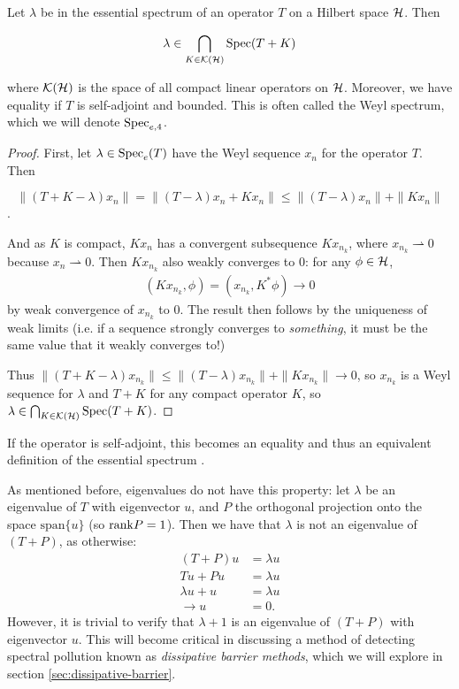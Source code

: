 \documentclass[../main.tex]{subfiles}
\begin{document}
\begin{theorem}
\label{thm:ess-spec-comp-ptb}
  Let $\lambda$ be in the essential spectrum of an operator $T$ on a Hilbert space
  $\mathcal{H}$. Then

  \begin{equation}
  \label{eqn:weyl_spectrum}
    \lambda \in \bigcap_{K \in \mathcal{K}(\mathcal{H})} \mathrm{Spec}(T + K)
  \end{equation}

  where $\mathcal{K}(\mathcal{H})$ is the space of all compact linear operators on $\mathcal{H}$.
  Moreover, we have equality if $T$ is self-adjoint and bounded.
  This is often called the Weyl spectrum, which we will denote $\mathrm{Spec}_{e,4}$.
\end{theorem}
\begin{proof}
First, let $\lambda \in \mathrm{Spec}_e(T)$ have the Weyl sequence $x_n$ for the operator $T$. Then 

$$\|(T+K-\lambda)x_n\| = \|(T - \lambda)x_n+Kx_n\| \leq \|(T - \lambda)x_n\| + \|Kx_n\|$$. 

And as $K$ is compact, $Kx_n$ has a convergent subsequence $Kx_{n_k}$, where
$x_{n_k} \rightharpoonup 0$ because $x_n \rightharpoonup 0$. Then
$Kx_{n_k}$ also weakly converges to 0: for any $\phi \in \mathcal{H}$,
\begin{align*}
(Kx_{n_k}, \phi) = (x_{n_k}, K^* \phi) \rightarrow 0
\end{align*}
by weak convergence of $x_{n_k}$ to 0. The result then follows by the uniqueness
of weak limits (i.e. if a sequence strongly converges to
\emph{something}, it must be the same value that it weakly converges to!)

Thus $\|(T+K-\lambda)x_{n_k}\| \leq \|(T - \lambda)x_{n_k}\| + \|Kx_{n_k}\|
\rightarrow 0$, so $x_{n_k}$ is a Weyl sequence for $\lambda$ and $T+K$
for any compact operator $K$, so $\lambda \in \bigcap_{K \in
\mathcal{K}(\mathcal{H})} \mathrm{Spec}(T + K)$.
\end{proof}

If the operator is self-adjoint, this becomes an equality and thus an equivalent
definition of the essential spectrum \cite{edmunds2018spectral}.

\begin{remark}
As mentioned before, eigenvalues do not have this property: let $\lambda$ be an
eigenvalue of $T$ with eigenvector $u$, and $P$ the orthogonal
projection onto the space $\mathrm{span}\{u\}$ (so $\mathrm{rank} P = 1$). Then we
have that $\lambda$ is not an eigenvalue of $(T+P)$, as otherwise:
\begin{align*}
  (T+P)u & = \lambda u \\
  Tu + Pu & = \lambda u \\
  \lambda u + u & = \lambda u \\
  \rightarrow u & = 0.
\end{align*}
However, it is trivial to
verify that $\lambda + 1$ is an eigenvalue of $(T+P)$ with eigenvector
$u$. This will become critical in
discussing a method of detecting spectral pollution known as
\emph{dissipative barrier methods}, which we will explore in section
\ref{sec:dissipative-barrier}.
\end{remark}
\end{document}
